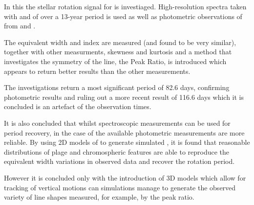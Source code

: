 In this {\paperorthesis} the stellar rotation signal for {\prox} is investiaged. High-resolution spectra taken with
{\uves} and {\harps} of {\prox} over a 13-year period is used as well as photometric observations of {\prox} from
{\asas} and {\hst}.

The {\ha} equivalent width and {\ha} index are measured (and found to be very similar), together with other measurments,
  skewness and kurtosis and a method that investigates the symmetry of the line, the Peak Ratio, is introduced which
  appears to return better results than the other measurements.

The investigations return a most significant period of 82.6 days, confirming photometric results and ruling out a more
  recent result of 116.6 days which it is concluded is an artefact of the observation times.

It is also concluded that whilst spectroscopic {\ha} measurements can be used for period recovery, in the case of
  {\prox} the available photometric measurements are more reliable. By using 2D models of {\prox} to generate simulated
  {\ha}, it is found that reasonable distributions of plage and chromospheric features are able to reproduce the
  equivalent width variations in observed data and recover the rotation period. 

However it is concluded only with the introduction of 3D models which allow for tracking of vertical motions can
simulations manage to generate the observed variety of line shapes measured, for example, by the peak ratio.
